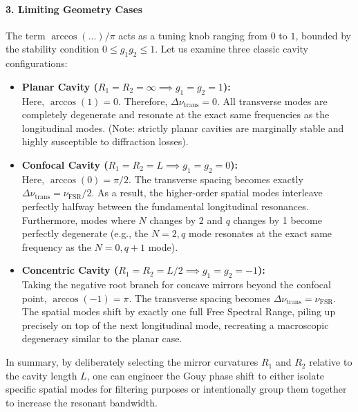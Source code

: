 \begin{resolucao}[Solution]
        \paragraph*{3. Limiting Geometry Cases}
            The term $\arccos(\dots)/\pi$ acts as a tuning knob ranging from $0$ to $1$, bounded by the stability condition $0 \le g_1 g_2 \le 1$. Let us examine three classic cavity configurations:
            
            \begin{itemize}
                \item \textbf{Planar Cavity ($R_1 = R_2 = \infty \implies g_1=g_2=1$):}\\
                Here, $\arccos(1) = 0$. Therefore, $\Delta\nu_{\mathrm{trans}} = 0$. All transverse modes are completely degenerate and resonate at the exact same frequencies as the longitudinal modes. (Note: strictly planar cavities are marginally stable and highly susceptible to diffraction losses).
                
                \item \textbf{Confocal Cavity ($R_1 = R_2 = L \implies g_1=g_2=0$):}\\
                Here, $\arccos(0) = \pi/2$. The transverse spacing becomes exactly $\Delta\nu_{\mathrm{trans}} = \nu_{\mathrm{FSR}}/2$. As a result, the higher-order spatial modes interleave perfectly halfway between the fundamental longitudinal resonances. Furthermore, modes where $N$ changes by 2 and $q$ changes by 1 become perfectly degenerate (e.g., the $N=2, q$ mode resonates at the exact same frequency as the $N=0, q+1$ mode).
                
                \item \textbf{Concentric Cavity ($R_1 = R_2 = L/2 \implies g_1=g_2=-1$):}\\
                Taking the negative root branch for concave mirrors beyond the confocal point, $\arccos(-1) = \pi$. The transverse spacing becomes $\Delta\nu_{\mathrm{trans}} = \nu_{\mathrm{FSR}}$. The spatial modes shift by exactly one full Free Spectral Range, piling up precisely on top of the next longitudinal mode, recreating a macroscopic degeneracy similar to the planar case.
            \end{itemize}
        
            In summary, by deliberately selecting the mirror curvatures $R_1$ and $R_2$ relative to the cavity length $L$, one can engineer the Gouy phase shift to either isolate specific spatial modes for filtering purposes or intentionally group them together to increase the resonant bandwidth.
\end{resolucao}